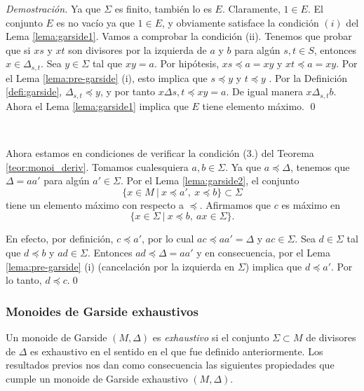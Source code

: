 \documentclass[12pt]{article}
\theoremstyle{definition}
\begin{document}
\textit{Demostración.} Ya que $\Sigma$ es finito, también lo es $E$. Claramente, $1\in E$. El conjunto $E$ es no vacío ya que $1\in E$, y obviamente satisface la condición $(i)$ del Lema \ref{lema:garside1}. Vamos a comprobar la condición (ii). Tenemos que probar que si $xs$ y $xt$ son divisores por la izquierda de $a$ y $b$ para algún $s,t\in S$, entonces $x\in\Delta_{s,t}$. Sea $y\in\Sigma$ tal que $xy=a$. Por hipótesis, $xs\preceq a = xy$ y $xt\preceq a = xy$. Por el Lema \ref{lema:pre-garside} (i), esto implica que $s\preceq y$ y $t\preceq y$ . Por la Definición \ref{defi:garside}, $\Delta_{s,t}\preceq y$, y por tanto $x\Delta{s,t}\preceq xy=a$. De igual manera $x\Delta_{s,t} b$. Ahora el Lema \ref{lema:garside1} implica que $E$ tiene elemento máximo. \qed

\ 

Ahora estamos en condiciones de verificar la condición (3.) del Teorema \ref{teor:monoi_deriv}. Tomamos cualesquiera $a,b\in\Sigma$. Ya que $a\preceq\Delta$, tenemos que $\Delta=aa'$ para algún $a'\in\Sigma$. Por el Lema \ref{lema:garside2}, el conjunto
$$\{x\in M\ |\ x\preceq a',\ x\preceq b\}\subset\Sigma$$ tiene un elemento máximo con respecto a $\preceq$. Afirmamos que $c$ es máximo en 
$$\{x\in\Sigma\ |\ x\preceq b,\ ax\in\Sigma\}.$$

En efecto, por definición, $c\preceq a'$, por lo cual $ac\preceq aa'=\Delta$ y $ac\in\Sigma$. Sea $d\in\Sigma$ tal que $d\preceq b$ y $ad\in\Sigma$. Entonces $ad\preceq\Delta=aa'$ y en consecuencia, por el Lema \ref{lema:pre-garside} (i) (cancelación por la izquierda en $\Sigma$) implica que $d\preceq a'$. Por lo tanto, $d\preceq c$.\qed

\subsubsection{Monoides de Garside exhaustivos}

Un monoide de Garside $(M,\Delta)$ es \textit{exhaustivo} si el conjunto $\Sigma\subset M$ de divisores de $\Delta$ es exhaustivo en el sentido en el que fue definido anteriormente. Los resultados previos nos dan como consecuencia las siguientes propiedades que cumple un monoide de Garside exhaustivo $(M,\Delta)$.
\end{document}
